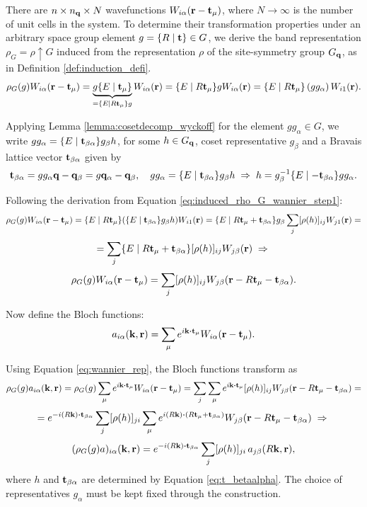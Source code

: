 There are \(n \times n_{\vb{q}} \times N\) wavefunctions \(W_{i\alpha}({\vb{r}} - {\vb{t}}_\mu)\), where \(N \to \infty\) is the number of unit cells in the system. To determine their transformation properties under an arbitrary space group element \(g = \{ R \mid {\vb{t}} \} \in G\), we derive the band representation \(\rho_G = \rho \uparrow G\) induced from the representation \(\rho\) of the site-symmetry group \(G_{\vb{q}}\), as in Definition \ref{def:induction_defi}.
\begin{equation} \label{eq:induced_rho_G_wannier_step1}
\rho_G(g) W_{i\alpha}({\vb{r}}-{\vb{t}}_\mu) =
\underbrace{g \{ E \mid {\vb{t}}_\mu \}}_{= \{ E \mid R{\vb{t}}_\mu \} g} W_{i\alpha} ({\vb{r}}) =
\{ E \mid R{\vb{t}}_\mu \} g W_{i\alpha} ({\vb{r}}) =
\{ E \mid R{\vb{t}}_\mu \} \, (g g_\alpha) \, W_{i1} ({\vb{r}}).
\end{equation}

Applying Lemma \ref{lemma:cosetdecomp_wyckoff} for the element $g g_\alpha \in G$, we write $g g_\alpha = \{ E \mid {\vb{t}}_{\beta\alpha} \} g_\beta h$, for some $h \in G_{\vb{q}}$, coset representative $g_\beta$ and a Bravais lattice vector ${\vb{t}}_{\beta\alpha}$ given by
\begin{equation} \label{eq:t_betaalpha}
{\vb{t}}_{\beta\alpha} = gg_\alpha {\vb{q}} - {\vb{q}}_\beta = g {\vb{q}}_\alpha - {\vb{q}}_\beta, \quad
g g_\alpha = \{ E \mid {\vb{t}}_{\beta\alpha} \} g_\beta h \; \Rightarrow \; h = g_\beta^{-1} \{E\mid -{\vb{t}}_{\beta\alpha}\} g g_\alpha.
\end{equation}

Following the derivation from Equation \ref{eq:induced_rho_G_wannier_step1}:
$$
\rho_G(g) W_{i\alpha}({\vb{r}}-{\vb{t}}_\mu) =
\{ E \mid R{\vb{t}}_\mu \} \qty(\{ E \mid {\vb{t}}_{\beta\alpha} \} g_\beta h) W_{i1}({\vb{r}}) =
\{ E \mid R{\vb{t}}_\mu + {\vb{t}}_{\beta\alpha} \} g_\beta \sum_{j} [\rho(h)]_{ij} W_{j1}({\vb{r}}) =
$$
$$
= \sum_{j} \{ E \mid R{\vb{t}}_\mu + {\vb{t}}_{\beta\alpha} \} [\rho(h)]_{ij} W_{j\beta}({\vb{r}}) \; \Rightarrow \;
$$
\begin{equation} \label{eq:wannier_rep}
\rho_G(g) W_{i\alpha}({\vb{r}}-{\vb{t}}_\mu) = \sum_{j} [\rho(h)]_{ij} W_{j\beta}({\vb{r}} - R{\vb{t}}_\mu - {\vb{t}}_{\beta\alpha}).
\end{equation}

\n

Now define the Bloch functions:
\begin{equation} \label{eq:bloch_functions}
a_{i\alpha}(\k, \r) = \sum_{\mu} e^{i\k\vdot\t_\mu} W_{i\alpha}(\r-\t_\mu).
\end{equation}

Using Equation \ref{eq:wannier_rep}, the Bloch functions transform as
$$
\rho_G(g) a_{i\alpha}(\k,\r) =
\rho_G(g) \sum_{\mu} e^{i\k\vdot\t_\mu} W_{i\alpha}(\r-\t_\mu) =
\sum_{j} \sum_{\mu} e^{i\k\vdot\t_\mu} [\rho(h)]_{ij} W_{j\beta}(\r-R\t_\mu-\t_{\beta\alpha}) =
$$
$$
= e^{-i(R\k)\vdot\t_{\beta\alpha}} \sum_{j} [\rho(h)]_{ji} \sum_{\mu} e^{i(R\k)\vdot(R\t_\mu+\t_{\beta\alpha})} W_{j\beta}(\r-R\t_\mu-\t_{\beta\alpha}) \implies
$$
\begin{equation} \label{eq:bloch_rep}
(\rho_G(g) a)_{i\alpha}(\k,\r) = e^{-i(R\k)\vdot\t_{\beta\alpha}} \sum_{j} [\rho(h)]_{ji} \, a_{j\beta}(R\k, \r),
\end{equation}
where $h$ and ${\vb{t}}_{\beta\alpha}$ are determined by Equation \ref{eq:t_betaalpha}. The choice of representatives $g_\alpha$ must be kept fixed through the construction.

